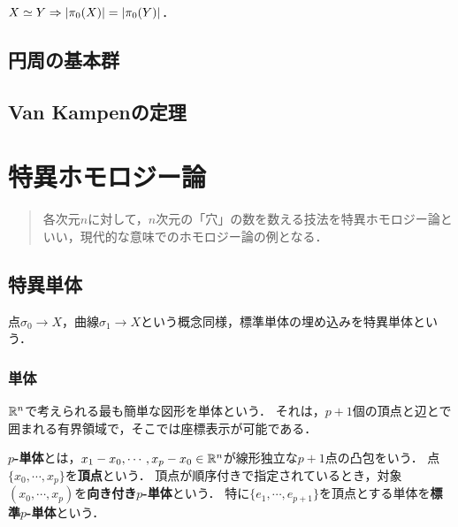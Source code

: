\documentclass[uplatex,dvipdfmx]{jsreport}
\begin{document}
\begin{corollary}[最初のホモトピー不変量]
    $X\simeq Y\Rightarrow\lvert\pi_0(X)\rvert=\lvert\pi_0(Y)\rvert$．
\end{corollary}


\section{円周の基本群}

\section{Van Kampenの定理}

\chapter{特異ホモロジー論}

\begin{quotation}
    各次元$n$に対して，$n$次元の「穴」の数を数える技法を特異ホモロジー論といい，現代的な意味でのホモロジー論の例となる．
\end{quotation}

\section{特異単体}

\begin{tcolorbox}[colframe=ForestGreen, colback=ForestGreen!10!white,breakable,colbacktitle=ForestGreen!40!white,coltitle=black,fonttitle=\bfseries\sffamily,
title=]
    点$\sigma_0\to X$，曲線$\sigma_1\to X$という概念同様，標準単体の埋め込みを特異単体という．
\end{tcolorbox}

\subsection{単体}

\begin{tcolorbox}[colframe=ForestGreen, colback=ForestGreen!10!white,breakable,colbacktitle=ForestGreen!40!white,coltitle=black,fonttitle=\bfseries\sffamily,
title=]
    $\mathbb{R}^n$で考えられる最も簡単な図形を単体という．
    それは，$p+1$個の頂点と辺とで囲まれる有界領域で，そこでは座標表示が可能である．
\end{tcolorbox}

\begin{notation}
    \textbf{$p$-単体}とは，$x_1-x_0,\cdots,x_p-x_0\in\mathbb{R}^n$が線形独立な$p+1$点の凸包をいう．
    点$\{x_0,\cdots,x_p\}$を\textbf{頂点}という．
    頂点が順序付きで指定されているとき，対象$(x_0,\cdots,x_p)$を\textbf{向き付き$p$-単体}という．
    特に$\{e_1,\cdots,e_{p+1}\}$を頂点とする単体を\textbf{標準$p$-単体}という．
\end{notation}
\end{document}
